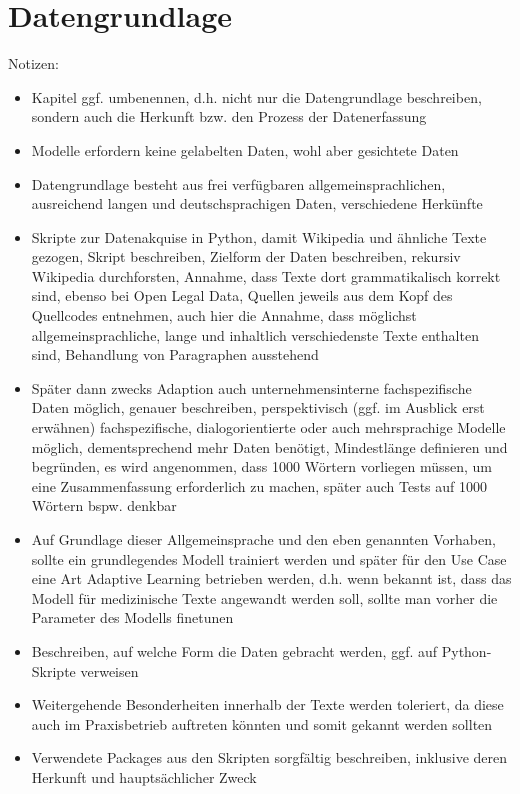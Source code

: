 \chapter{Datengrundlage}
\thispagestyle{fancy}
\label{chap:Datengrundlage}

Notizen:
\begin{itemize}
	\item Kapitel ggf. umbenennen, d.h. nicht nur die Datengrundlage beschreiben, sondern auch die Herkunft bzw. den Prozess der Datenerfassung
	\item Modelle erfordern keine gelabelten Daten, wohl aber gesichtete Daten
	\item Datengrundlage besteht aus frei verfügbaren allgemeinsprachlichen, ausreichend langen und deutschsprachigen Daten, verschiedene Herkünfte
	\item Skripte zur Datenakquise in Python, damit Wikipedia und ähnliche Texte gezogen, Skript beschreiben, Zielform der Daten beschreiben, rekursiv Wikipedia durchforsten, Annahme, dass Texte dort grammatikalisch korrekt sind, ebenso bei Open Legal Data, Quellen jeweils aus dem Kopf des Quellcodes entnehmen, auch hier die Annahme, dass möglichst allgemeinsprachliche, lange und inhaltlich verschiedenste Texte enthalten sind, Behandlung von Paragraphen ausstehend
	\item Später dann zwecks Adaption auch unternehmensinterne fachspezifische Daten möglich, genauer beschreiben, perspektivisch (ggf. im Ausblick erst erwähnen) fachspezifische, dialogorientierte oder auch mehrsprachige Modelle möglich, dementsprechend mehr Daten benötigt, Mindestlänge definieren und begründen, es wird angenommen, dass 1000 Wörtern vorliegen müssen, um eine Zusammenfassung erforderlich zu machen, später auch Tests auf 1000 Wörtern bspw. denkbar
	\item Auf Grundlage dieser Allgemeinsprache und den eben genannten Vorhaben, sollte ein grundlegendes Modell trainiert werden und später für den Use Case eine Art Adaptive Learning betrieben werden, d.h. wenn bekannt ist, dass das Modell für medizinische Texte angewandt werden soll, sollte man vorher die Parameter des Modells finetunen
	\item Beschreiben, auf welche Form die Daten gebracht werden, ggf. auf Python-Skripte verweisen
	\item Weitergehende Besonderheiten innerhalb der Texte werden toleriert, da diese auch im Praxisbetrieb auftreten könnten und somit gekannt werden sollten
	\item Verwendete Packages aus den Skripten sorgfältig beschreiben, inklusive deren Herkunft und hauptsächlicher Zweck

\end{itemize}
